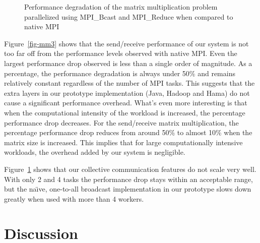 \documentclass[conference,10pt] {IEEEtran}
\begin{document}
\begin{figure}[t]
  \centering
  \caption{Performance degradation of the matrix multiplication problem parallelized using MPI\_Bcast and MPI\_Reduce when compared to native MPI}
  \label{fig-mm4}
\end{figure}

Figure~\ref{fig-mm3} shows that the send/receive performance of our system is not too far off from the performance levels observed with native MPI. Even the largest performance drop observed is less than a single order of magnitude. As a percentage, the performance degradation is always under 50\% and remains relatively constant regardless of the number of MPI tasks. This suggests that the extra layers in our prototype implementation (Java, Hadoop and Hama) do not cause a significant performance overhead. What's even more interesting is that when the computational intensity of the workload is increased, the percentage performance drop decreases. For the send/receive matrix multiplication, the percentage performance drop reduces from around 50\% to almost 10\% when the matrix size is increased. This implies that for large computationally intensive workloads, the overhead added by our system is negligible. 

Figure~\ref{fig-mm4} shows that our collective communication features do not scale very well. With only 2 and 4 tasks the performance drop stays within an acceptable range, but the na\"{\i}ve, one-to-all broadcast implementation in our prototype slows down greatly when used with more than 4 workers.

\section{Discussion}
\end{document}
